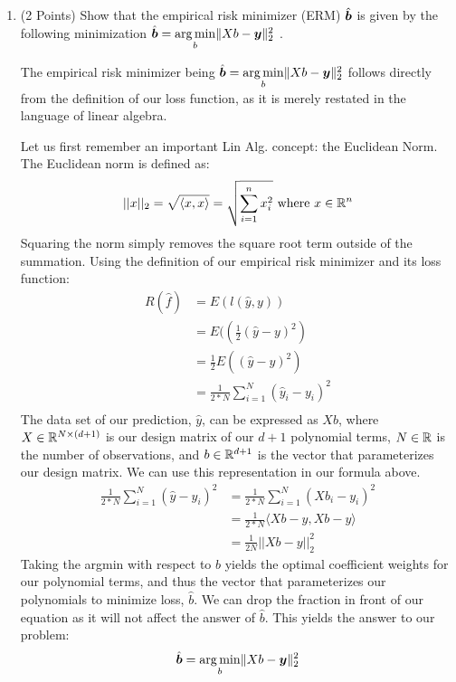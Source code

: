 \documentclass{article}
\newcommand{\bb}{b}
\begin{document}
\begin{enumerate}
\setcounter{enumi}{\value{saveenum}}
    \item (2 Points) Show that the empirical risk minimizer (ERM) $\hat{\bs \bb}$ is given by the following minimization $\hat{\bs \bb} = \underset{\bb}{\arg\min}\lVert X\bb - \bs y \Vert_2^2$ .
    
    \subitem The empirical risk minimizer being $\hat{\bs \bb} = \underset{\bb}{\arg\min}\lVert X\bb - \bs y \Vert_2^2$ follows directly from the definition of our loss function, as it is merely restated in the language of linear algebra. 
    
    Let us first remember an important Lin Alg. concept: the Euclidean Norm. The Euclidean norm is defined as: 
    $$
        ||x||_2 = \sqrt{\langle x, x\rangle} = \sqrt{\sum_{i=1}^n x_i^2} \text{ where } x \in \mathbb{R}^n 
    $$
    Squaring the norm simply removes the square root term outside of the summation. Using the definition of our empirical risk minimizer and its loss function:
    \begin{equation}
        \begin{split}
            R(\hat{f}) &= E(l(\hat{y},y)) \\
            &= E((\frac{1}{2}(\hat{y}-y)^2) \\
            &= \frac{1}{2}E((\hat{y}-y)^2) \\
            &= \frac{1}{2*N}\sum_{i=1}^N (\hat{y}_i - y_i)^2 \\
        \end{split}
    \end{equation}
    The data set of our prediction, $\hat{y}$, can be expressed as $Xb$, where $X \in \mathbb{R}^{N \times (d+1)}$ is our design matrix of our $d+1$ polynomial terms, $N \in \mathbb{R}$ is the number of observations, and $b \in \mathbb{R}^{d+1}$ is the vector that parameterizes our design matrix. We can use this representation in our formula above.
    \begin{equation}
        \begin{split}
            \frac{1}{2*N}\sum_{i=1}^N (\hat{y} - y_i)^2 &= \frac{1}{2*N}\sum_{i=1}^N (Xb_i - y_i)^2 \\
            &= \frac{1}{2*N} \langle Xb-y, Xb-y\rangle \\
            &= \frac{1}{2N} ||Xb-y||_2^2
        \end{split}
    \end{equation}
    Taking the argmin with respect to $b$ yields the optimal coefficient weights for our polynomial terms, and thus the vector that parameterizes our polynomials to minimize loss, $\hat{b}$. We can drop the fraction in front of our equation as it will not affect the answer of $\hat{b}$. This yields the answer to our problem:
    $$
        \hat{\bs \bb} = \underset{\bb}{\arg\min}\lVert X\bb - \bs y \Vert_2^2
    $$  
    

\end{enumerate}
\end{document}
